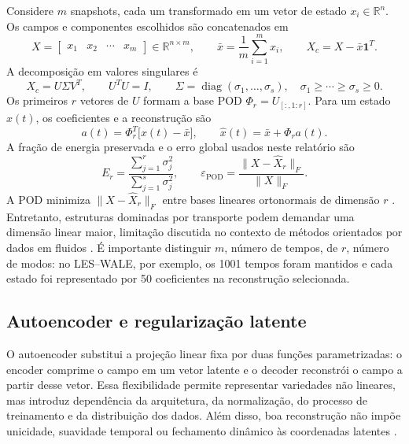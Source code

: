 \documentclass[12pt,a4paper]{article}
\begin{document}
Considere $m$ snapshots, cada um transformado em um vetor de estado $x_i\in\mathbb{R}^{n}$. Os campos e componentes escolhidos são concatenados em
\begin{equation}
X=\begin{bmatrix}x_1&x_2&\cdots&x_m\end{bmatrix}\in\mathbb{R}^{n\times m},
\qquad
\bar x=\frac{1}{m}\sum_{i=1}^{m}x_i,
\qquad
X_c=X-\bar x\mathbf{1}^{T}.
\label{eq:matriz_snapshots}
\end{equation}
A decomposição em valores singulares é
\begin{equation}
X_c=U\Sigma V^{T},
\qquad
U^{T}U=I,
\qquad
\Sigma=\operatorname{diag}(\sigma_1,\ldots,\sigma_s),
\quad \sigma_1\geq\cdots\geq\sigma_s\geq0.
\label{eq:svd_pod}
\end{equation}
Os primeiros $r$ vetores de $U$ formam a base POD $\Phi_r=U_{[:,1:r]}$. Para um estado $x(t)$, os coeficientes e a reconstrução são
\begin{equation}
a(t)=\Phi_r^{T}\bigl[x(t)-\bar x\bigr],
\qquad
\widehat{x}(t)=\bar x+\Phi_r a(t).
\label{eq:pod_projecao}
\end{equation}
A fração de energia preservada e o erro global usados neste relatório são
\begin{equation}
E_r=\frac{\sum_{j=1}^{r}\sigma_j^2}{\sum_{j=1}^{s}\sigma_j^2},
\qquad
\varepsilon_{\mathrm{POD}}=
\frac{\lVert X-\widehat X_r\rVert_F}{\lVert X\rVert_F}.
\label{eq:pod_metricas}
\end{equation}
A POD minimiza $\lVert X-\widehat X_r\rVert_F$ entre bases lineares ortonormais de dimensão $r$ \cite{sirovich1987,mendez2023}. Entretanto, estruturas dominadas por transporte podem demandar uma dimensão linear maior, limitação discutida no contexto de métodos orientados por dados em fluidos \cite{mendez2023,bruntonKutz2019}. É importante distinguir $m$, número de tempos, de $r$, número de modos: no LES--WALE, por exemplo, os 1001 tempos foram mantidos e cada estado foi representado por 50 coeficientes na reconstrução selecionada.

\subsection{Autoencoder e regularização latente}
O autoencoder substitui a projeção linear fixa por duas funções parametrizadas: o encoder comprime o campo em um vetor latente e o decoder reconstrói o campo a partir desse vetor. Essa flexibilidade permite representar variedades não lineares, mas introduz dependência da arquitetura, da normalização, do processo de treinamento e da distribuição dos dados. Além disso, boa reconstrução não impõe unicidade, suavidade temporal ou fechamento dinâmico às coordenadas latentes \cite{hinton2006,bruntonKutz2019}.
\end{document}
